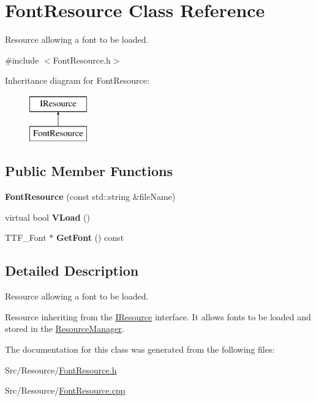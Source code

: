 \hypertarget{classFontResource}{\section{Font\-Resource Class Reference}
\label{classFontResource}
}


Resource allowing a font to be loaded.  




{\ttfamily \#include $<$Font\-Resource.\-h$>$}

Inheritance diagram for Font\-Resource\-:\begin{figure}[H]
\begin{center}
\leavevmode
\includegraphics[height=2.000000cm]{classFontResource}
\end{center}
\end{figure}
\subsection*{Public Member Functions}
\begin{DoxyCompactItemize}
\item 
\hypertarget{classFontResource_a9eb94484587129c33dcb07ac05d992b9}{{\bfseries Font\-Resource} (const std\-::string \&file\-Name)}\label{classFontResource_a9eb94484587129c33dcb07ac05d992b9}

\item 
\hypertarget{classFontResource_a11180f4cc574eb1836563094bca3c3f5}{virtual bool {\bfseries V\-Load} ()}\label{classFontResource_a11180f4cc574eb1836563094bca3c3f5}

\item 
\hypertarget{classFontResource_ac6e536ca1f9290704e2e80fdd6851425}{T\-T\-F\-\_\-\-Font $\ast$ {\bfseries Get\-Font} () const }\label{classFontResource_ac6e536ca1f9290704e2e80fdd6851425}

\end{DoxyCompactItemize}


\subsection{Detailed Description}
Resource allowing a font to be loaded. 

Resource inheriting from the \hyperlink{classIResource}{I\-Resource} interface. It allows fonts to be loaded and stored in the \hyperlink{classResourceManager}{Resource\-Manager}. 

The documentation for this class was generated from the following files\-:\begin{DoxyCompactItemize}
\item 
Src/\-Resource/\hyperlink{FontResource_8h}{Font\-Resource.\-h}\item 
Src/\-Resource/\hyperlink{FontResource_8cpp}{Font\-Resource.\-cpp}\end{DoxyCompactItemize}
